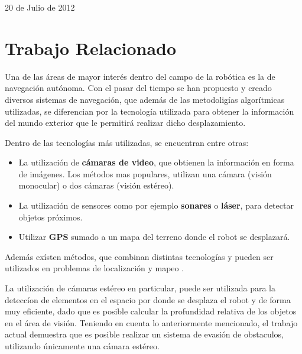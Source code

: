 \documentclass[journal]{IEEEtran}
\begin{document}
\hfill 20 de Julio de 2012

\section{Trabajo Relacionado}
\label{sec:trabajajo_relacionado}

Una de las \'areas de mayor inter\'es dentro del campo de la rob\'otica es la de navegaci\'on aut\'onoma. Con el pasar del tiempo se han propuesto y creado diversos sistemas de navegaci\'on, que adem\'as de las metodolig\'ias algor\'itmicas utilizadas, se diferencian por la tecnolog\'ia utilizada para obtener la informaci\'on del mundo exterior que le permitir\'a realizar dicho desplazamiento.

Dentro de las tecnolog\'ias m\'as utilizadas, se encuentran entre otras:

\begin{itemize}
	\item La utilizaci\'on de {\bf c\'amaras de video}, que obtienen la informaci\'on en forma de im\'agenes. Los m\'etodos mas populares, utilizan una c\'amara (visi\'on monocular) o dos c\'amaras (visi\'on est\'ereo).
	
	\item La utilizaci\'on de sensores como por ejemplo {\bf sonares} o {\bf l\'aser}, para detectar objetos pr\'oximos.
	
	\item Utilizar {\bf GPS} sumado a un mapa del terreno donde el robot se desplazar\'a.
\end{itemize}

Adem\'as ex\'isten m\'etodos, que combinan distintas tecnolog\'ias y pueden ser utilizados en problemas de localizaci\'on y mapeo \cite{KNG10}.

La utilización de c\'amaras est\'ereo en particular, puede ser utilizada para la detecc\'ion de elementos en el espacio por donde se desplaza el robot y de forma muy eficiente, dado que es posible calcular la profundidad relativa de los objetos en el \'area de visi\'on. Teniendo en cuenta lo anteriormente mencionado, el trabajo actual demuestra que es posible realizar un sistema de evasi\'on de obstaculos, utilizando \'unicamente una c\'amara est\'ereo.
\end{document}
